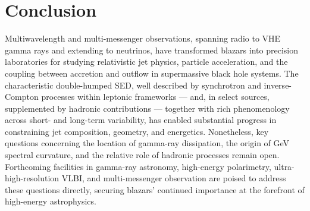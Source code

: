 \documentclass[11pt]{article}
\begin{document}
\section{Conclusion}

Multiwavelength and multi-messenger observations, spanning radio to VHE gamma rays and extending to neutrinos, have transformed blazars into precision laboratories for studying relativistic jet physics, particle acceleration, and the coupling between accretion and outflow in supermassive black hole systems. The characteristic double-humped SED, well described by synchrotron and inverse-Compton processes within leptonic frameworks --- and, in select sources, supplemented by hadronic contributions --- together with rich phenomenology across short- and long-term variability, has enabled substantial progress in constraining jet composition, geometry, and energetics. Nonetheless, key questions concerning the location of gamma-ray dissipation, the origin of GeV spectral curvature, and the relative role of hadronic processes remain open. Forthcoming facilities in gamma-ray astronomy, high-energy polarimetry, ultra-high-resolution VLBI, and multi-messenger observation are poised to address these questions directly, securing blazars' continued importance at the forefront of high-energy astrophysics.
\end{document}
